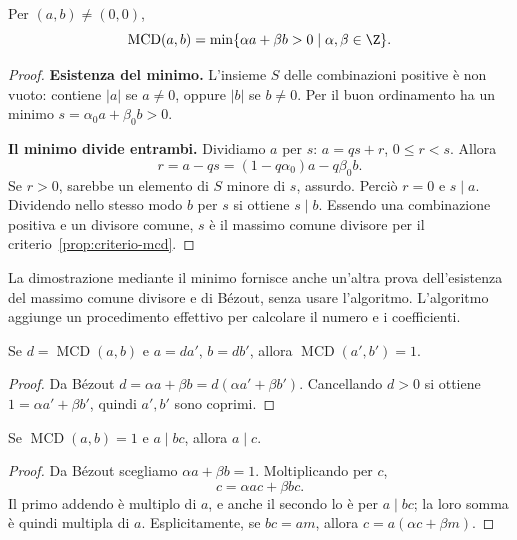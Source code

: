 \begin{proposizione}\label{prop:min-combinazione}
Per $(a,b)\ne(0,0)$,
\[
\operatorname{MCD}(a,b)=\min\{\alpha a+\beta b>0\mid\alpha,\beta\in\Z\}.
\]
\end{proposizione}
\begin{proof}
\textbf{Esistenza del minimo.} L'insieme $S$ delle combinazioni positive è non vuoto: contiene $|a|$ se $a\ne0$, oppure $|b|$ se $b\ne0$. Per il buon ordinamento ha un minimo $s=\alpha_0a+\beta_0b>0$.

\textbf{Il minimo divide entrambi.} Dividiamo $a$ per $s$: $a=qs+r$, $0\le r<s$. Allora
\[
r=a-qs=(1-q\alpha_0)a-q\beta_0b.
\]
Se $r>0$, sarebbe un elemento di $S$ minore di $s$, assurdo. Perciò $r=0$ e $s\mid a$. Dividendo nello stesso modo $b$ per $s$ si ottiene $s\mid b$. Essendo una combinazione positiva e un divisore comune, $s$ è il massimo comune divisore per il criterio~\ref{prop:criterio-mcd}.
\end{proof}

\begin{osservazione}
La dimostrazione mediante il minimo fornisce anche un'altra prova dell'esistenza del massimo comune divisore e di Bézout, senza usare l'algoritmo. L'algoritmo aggiunge un procedimento effettivo per calcolare il numero e i coefficienti.
\end{osservazione}

\begin{corollario}
Se $d=\operatorname{MCD}(a,b)$ e $a=da'$, $b=db'$, allora $\operatorname{MCD}(a',b')=1$.
\end{corollario}
\begin{proof}
Da Bézout $d=\alpha a+\beta b=d(\alpha a'+\beta b')$. Cancellando $d>0$ si ottiene $1=\alpha a'+\beta b'$, quindi $a',b'$ sono coprimi.
\end{proof}

\begin{lemma}[Euclide]\label{lem:euclide}
Se $\operatorname{MCD}(a,b)=1$ e $a\mid bc$, allora $a\mid c$.
\end{lemma}
\begin{proof}
Da Bézout scegliamo $\alpha a+\beta b=1$. Moltiplicando per $c$,
\[
c=\alpha ac+\beta bc.
\]
Il primo addendo è multiplo di $a$, e anche il secondo lo è per $a\mid bc$; la loro somma è quindi multipla di $a$. Esplicitamente, se $bc=am$, allora $c=a(\alpha c+\beta m)$.
\end{proof}

